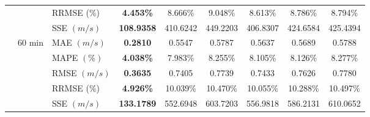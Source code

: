 {\begin{longtable}[htb!]{lllcccccc}
& {} & {RRMSE {(\%)}} & {\textbf{4.453\%}} & {8.666\%} & {9.048\%} & {8.613\%} & {8.786\%} & {8.794\%} \\
& {} & {SSE {$(m/s)$}} & {\textbf{108.9358}} & {410.6242} & {449.2203} & {406.8307} & {424.6584} & {425.4394} \\
& 60 min & MAE {$(m/s)$} & \textbf{0.2810} & 0.5547 & 0.5787 & 0.5637 & 0.5689 & 0.5788 \\
&  & MAPE {$(\%)$} & \textbf{4.038\%} & 7.983\% & 8.255\% & 8.105\% & 8.126\% & 8.277\% \\
&  & RMSE {$(m/s)$} & \textbf{0.3635} & 0.7405 & 0.7739 & 0.7433 & 0.7626 & 0.7780 \\
& {} & {RRMSE {(\%)}} & {\textbf{4.926\%}} & {10.039\%} & {10.470\%} & {10.055\%} & {10.288\%} & {10.497\%} \\
& {} & {SSE {$(m/s)$}} & {\textbf{133.1789}} & {552.6948} & {603.7203} & {556.9818} & {586.2131} & {610.0652} \\ \hline
\end{longtable}
}